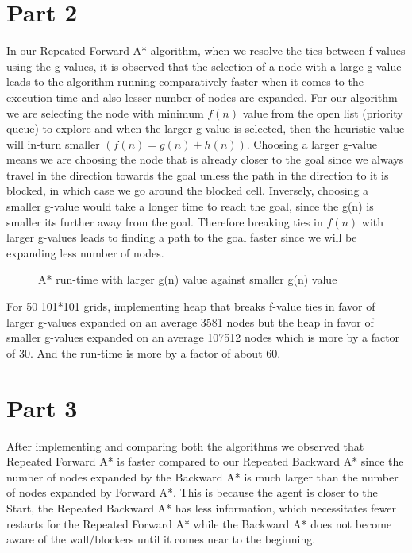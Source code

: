 \documentclass{article}
\begin{document}
\section*{Part 2}

In our Repeated Forward A* algorithm, when we resolve the ties between f-values using the g-values, it is observed that the selection of a node with a large g-value leads to the algorithm running comparatively faster when it comes to the execution time and also lesser number of nodes are expanded. 
For our algorithm we are selecting the node with minimum $f(n)$ value from the open list (priority queue) to explore and when the larger g-value is selected, then the heuristic value will in-turn smaller $(f(n) = g(n) + h(n))$. Choosing a larger g-value means we are choosing the node that is already closer to the goal since we always travel in the direction towards the goal unless the path in the direction to it is blocked, in which case we go around the blocked cell. Inversely, choosing a smaller g-value would take a longer time to reach the goal, since the g(n) is smaller its further away from the goal. Therefore breaking ties in $f(n)$ with larger g-values leads to finding a path to the goal faster since we will be expanding less number of nodes.

\begin{figure}[!ht]
    \centering
    \caption{A* run-time with larger g(n) value against smaller g(n) value}
    \label{fig:my_label}
\end{figure}

For 50 101*101 grids, implementing heap that breaks f-value ties in favor of larger g-values expanded on an average 3581 nodes but the heap in favor of smaller g-values expanded on an average 107512 nodes which is more by a factor of 30.
And the run-time is more by a factor of about 60.


\section*{Part 3}

After implementing and comparing both the algorithms we observed that Repeated Forward A* is faster compared to our Repeated Backward A* since the number of nodes expanded by the Backward A* is much larger than the number of nodes expanded by Forward A*. This is because the agent is closer to the Start, the Repeated Backward A* has less information, which necessitates fewer restarts for the Repeated Forward A* while the Backward A* does not become aware of the wall/blockers until it comes near to the beginning.
\end{document}
